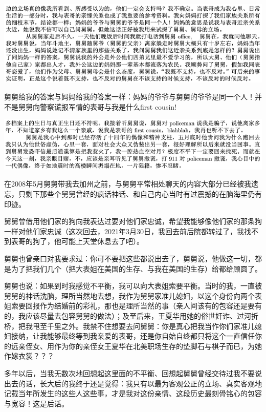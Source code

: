 \documentclass[9pt, b5paper]{article}
\begin{document}
\begin{center}
\includegraphics[width=.9\linewidth]{./pic/p1p45-3.png}
\end{center}

舅舅给我的答案与妈妈给我的答案一样：妈妈的爷爷与舅舅的爷爷是同一个人！并不是舅舅向警察谎报军情的表哥与我是什么first cousin!

\begin{center}
\includegraphics[width=.9\linewidth]{./pic/p1p68-2.png}
\end{center}

在2008年5月舅舅带我去加州之前，与舅舅平常相处聊天的内容大部分已经被我遗忘，只剩下那些个舅舅曾经的疯话神话、和自己内心当时有过震撼的在脑海里仍有印迹。

舅舅曾借用他们家的狗向我表达过要对他们家忠诚，希望我能够像他们家的那条狗一样对他们家忠诚（这次回去，2021年3月30日，我回去前后院都转过了，我找不到表哥的狗了，他可能上天堂休息去了吧）。

舅舅也曾亲口对我要求过：你可不要把这些都说出去了，舅舅说，他做这一切，都是为了把我们几个（把大表姐在美国的生存、与我在美国的生存）给都给顾圆了。 

舅舅也说：如果到时我感觉不平衡，我可以向大表姐索要平衡。当时的我，一直被舅舅的神话洗脑，理所当然地去想，我作为舅舅家准儿媳妇，以这个身份向两个表姐索要回报作为结婚前的彩礼，那也是理所当然的事（亲人间该有的包容还是要有的，我应该尽量去包容舅舅的做法）；及至后来，王夏华用她的俗世奸诈、过河折桥，把我甩至千里之外。我禁不住想要去问舅舅：你是真心把我当作你们家准儿媳妇接纳，让我能够最终等到我亲爱的表哥，还是你自始自终都只将这个一直信任你的远亲侄女、用作为你的亲侄女王夏华在北美职场生存的垫脚石与棋子而已，为她作嫁衣裳？？？

多年以后，当我无数次地回想起这里面的不平衡、回想起舅舅曾经交待过我不要说出去的话，长大后的我终于还是觉得：我只有以最为客观公正的立场、真实客观地记载当年所发生的这些人这些事，才是我对这份亲情、这段历史最刻骨铭心的包容与宽容！这是后话。
\end{document}
